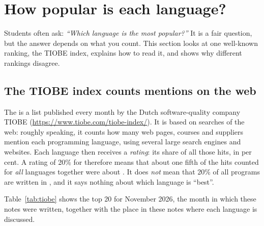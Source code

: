 \section{How popular is each language?}
\label{sec:popularity}

Students often ask: \emph{``Which language is the most popular?''} It is a fair question,
but the answer depends on what you count. This section looks at one well-known ranking, the
TIOBE index, explains how to read it, and shows why different rankings disagree.

\subsection*{The TIOBE index counts mentions on the web}

The  is a list published every month by the Dutch software-quality
company TIOBE (\url{https://www.tiobe.com/tiobe-index/}). It is based on searches of the
web: roughly speaking, it counts how many web pages, courses and suppliers mention each
programming language, using several large search engines and websites. Each language then
receives a \emph{rating}: its share of all those hits, in per cent. A rating of 20\% for
\py therefore means that about one fifth of the hits counted for \emph{all} languages
together were about \py. It does \emph{not} mean that 20\% of all programs are written in
\py, and it says nothing about which language is ``best''.

Table~\ref{tab:tiobe} shows the top 20 for November 2026, the month in which these notes
were written, together with the place in these notes where each language is discussed.

